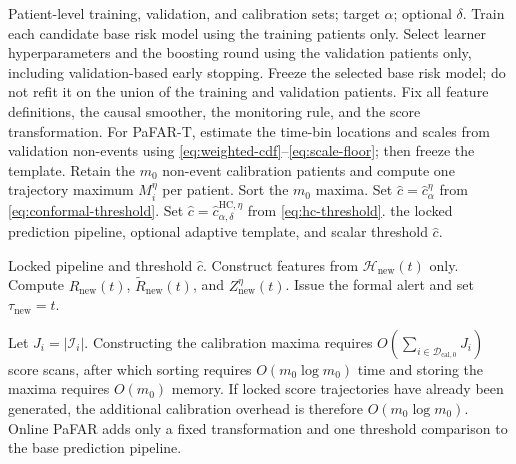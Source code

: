 \documentclass[11pt]{article}
\newcommand{\calD}{\mathcal{D}}
\newcommand{\calH}{\mathcal{H}}
\newcommand{\calI}{\mathcal{I}}
\begin{document}
\begin{algorithm}[H]
\caption{PaFAR fitting and calibration}
\label{alg:calibration}
\begin{algorithmic}[1]
\Require Patient-level training, validation, and calibration sets; target $\alpha$; optional $\delta$.
\State Train each candidate base risk model using the training patients only.
\State Select learner hyperparameters and the boosting round using the validation patients only, including validation-based early stopping.
\State Freeze the selected base risk model; do not refit it on the union of the training and validation patients.
\State Fix all feature definitions, the causal smoother, the monitoring rule, and the score transformation.
\State For PaFAR-T, estimate the time-bin locations and scales from validation non-events using \eqref{eq:weighted-cdf}--\eqref{eq:scale-floor}; then freeze the template.
\State Retain the $m_0$ non-event calibration patients and compute one trajectory maximum $M_i^{\eta}$ per patient.
\State Sort the $m_0$ maxima.
    \State Set $\widehat c=\widehat c_{\alpha}^{\eta}$ from \eqref{eq:conformal-threshold}.
\Else
    \State Set $\widehat c=\widehat c_{\alpha,\delta}^{\mathrm{HC},\eta}$ from \eqref{eq:hc-threshold}.
\EndIf
\State \Return the locked prediction pipeline, optional adaptive template, and scalar threshold $\widehat c$.
\end{algorithmic}
\end{algorithm}

\begin{algorithm}[H]
\caption{Online deployment for a new patient}
\label{alg:online}
\begin{algorithmic}[1]
\Require Locked pipeline and threshold $\widehat c$.
    \State Construct features from $\calH_{\mathrm{new}}(t)$ only.
    \State Compute $R_{\mathrm{new}}(t)$, $\widetilde R_{\mathrm{new}}(t)$, and $Z_{\mathrm{new}}^{\eta}(t)$.
        \State Issue the formal alert and set $\tau_{\mathrm{new}}=t$.
    \EndIf
\EndFor
\end{algorithmic}
\end{algorithm}

Let $J_i=|\calI_i|$. Constructing the calibration maxima requires $O\!\left(\sum_{i\in\calD_{\mathrm{cal},0}}J_i\right)$ score scans, after which sorting requires $O(m_0\log m_0)$ time and storing the maxima requires $O(m_0)$ memory. If locked score trajectories have already been generated, the additional calibration overhead is therefore $O(m_0\log m_0)$. Online PaFAR adds only a fixed transformation and one threshold comparison to the base prediction pipeline.
\end{document}
